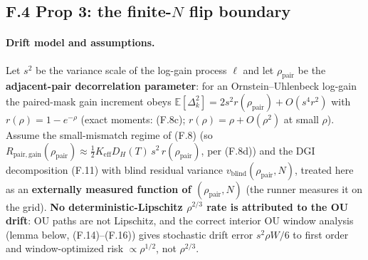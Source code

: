 \subsection{F.4 Prop 3: the finite-\texorpdfstring{$N$}{N} flip boundary}

\paragraph{Drift model and assumptions.} Let $s^2$ be the variance scale of the log-gain process $\ell$ and let $\rho_{\mathrm{pair}}$ be the \textbf{adjacent-pair decorrelation parameter}: for an Ornstein--Uhlenbeck log-gain the paired-mask gain increment obeys $\mathbb{E}[\Delta_k^2]=2s^2r(\rho_{\mathrm{pair}})+O(s^4r^2)$ with $r(\rho)=1-e^{-\rho}$ (exact moments: (F.8c); $r(\rho)=\rho+O(\rho^2)$ at small $\rho$). Assume the small-mismatch regime of (F.8) (so $R_{\mathrm{pair,gain}}(\rho_{\mathrm{pair}})\approx\tfrac12 K_{\mathrm{eff}}D_H(T)\,s^2\,r(\rho_{\mathrm{pair}})$, per (F.8d)) and the DGI decomposition (F.11) with blind residual variance $v_{\mathrm{blind}}(\rho_{\mathrm{pair}},N)$, treated here as an \textbf{externally measured function of $(\rho_{\mathrm{pair}},N)$} (the runner measures it on the grid). \textbf{No deterministic-Lipschitz $\rho^{2/3}$ rate is attributed to the OU drift}: OU paths are not Lipschitz, and the correct interior OU window analysis (lemma below, (F.14)--(F.16)) gives stochastic drift error $s^2\rho W/6$ to first order and window-optimized risk $\propto\rho^{1/2}$, not $\rho^{2/3}$.

